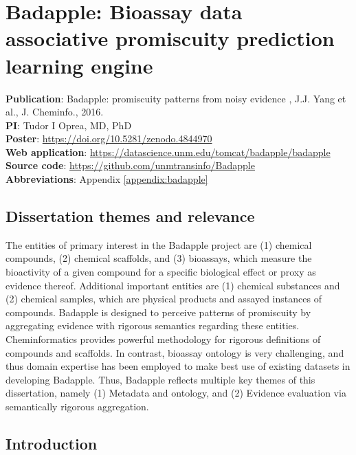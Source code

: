 \chapter{Badapple: Bioassay data associative promiscuity prediction learning engine}

\textbf{Publication}: Badapple: promiscuity patterns from noisy evidence , J.J. Yang et al., J. Cheminfo., 2016\cite{Yang2016-gn}.\\
\textbf{PI}: Tudor I Oprea, MD, PhD\\
\textbf{Poster}: \href{https://doi.org/10.5281/zenodo.4844970}{https://doi.org/10.5281/zenodo.4844970}\\
\textbf{Web application}: \href{https://datascience.unm.edu/tomcat/badapple/badapple}{https://datascience.unm.edu/tomcat/badapple/badapple}\\
\textbf{Source code}: \href{https://github.com/unmtransinfo/Badapple}{https://github.com/unmtransinfo/Badapple}\\
\textbf{Abbreviations}: Appendix \ref{appendix:badapple}

\section{Dissertation themes and relevance}

The entities of primary interest in the Badapple project are (1) chemical 
compounds, (2) chemical scaffolds, and (3) bioassays, which measure 
the bioactivity of a given compound for a specific biological effect or
proxy as evidence thereof. Additional important entities are (1) chemical 
substances and (2) chemical samples, which are physical products and 
assayed instances of compounds. Badapple is designed to perceive patterns
of promiscuity by aggregating evidence with rigorous semantics regarding these entities. Cheminformatics provides powerful methodology for rigorous definitions of compounds and scaffolds. In contrast, bioassay ontology is very challenging, and thus domain expertise has been employed to make best use of existing datasets in developing Badapple. Thus, Badapple reflects multiple key themes of this dissertation, namely (1) Metadata and ontology, and (2) Evidence evaluation via semantically rigorous aggregation.

\section{Introduction}

